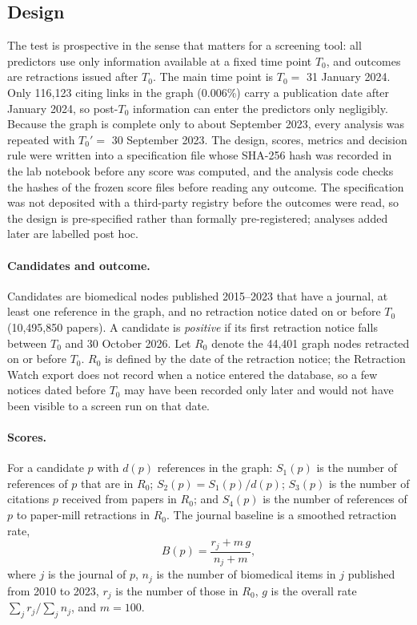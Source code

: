 \documentclass[pdflatex,sn-basic]{sn-jnl}
\begin{document}
\subsection{Design}
The test is prospective in the sense that matters for a screening tool: all predictors use only information available
at a fixed time point $T_0$, and outcomes are retractions issued after $T_0$. The main time point is
$T_0 = $ 31 January 2024. Only 116,123 citing links in the graph (0.006\%) carry a publication date after January 2024,
so post-$T_0$ information can enter the predictors only negligibly. Because the graph is complete only to about September 2023, every analysis was
repeated with $T_0' = $ 30 September 2023. The design, scores, metrics and decision rule were written into a
specification file whose SHA-256 hash was recorded in the lab notebook before any score was computed, and the analysis
code checks the hashes of the frozen score files before reading any outcome. The specification was not deposited with a
third-party registry before the outcomes were read, so the design is pre-specified rather than formally
pre-registered; analyses added later are labelled post hoc.

\paragraph{Candidates and outcome.} Candidates are biomedical nodes published 2015--2023 that have a journal, at least
one reference in the graph, and no retraction notice dated on or before $T_0$ (10,495,850 papers). A candidate is
\emph{positive} if its first retraction notice falls between $T_0$ and 30 October 2026. Let $R_0$ denote the 44,401
graph nodes retracted on or before $T_0$. $R_0$ is defined by the date of the retraction notice; the Retraction
Watch export does not record when a notice entered the database, so a few notices dated before $T_0$ may have been
recorded only later and would not have been visible to a screen run on that date.

\paragraph{Scores.} For a candidate $p$ with $d(p)$ references in the graph:
$S_1(p)$ is the number of references of $p$ that are in $R_0$;
$S_2(p) = S_1(p)/d(p)$;
$S_3(p)$ is the number of citations $p$ received from papers in $R_0$; and
$S_4(p)$ is the number of references of $p$ to paper-mill retractions in $R_0$.
The journal baseline is a smoothed retraction rate,
\[
B(p) = \frac{r_j + m\,g}{n_j + m},
\]
where $j$ is the journal of $p$, $n_j$ is the number of biomedical items in $j$ published from 2010 to 2023,
$r_j$ is the number of those in $R_0$, $g$ is the overall rate $\sum_j r_j / \sum_j n_j$, and $m = 100$.
\end{document}
